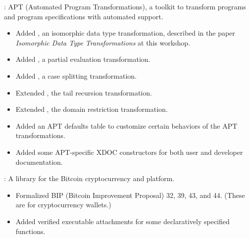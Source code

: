 \begin{frame}

\implibtitle

:
APT (Automated Program Transformations),
a toolkit to transform programs and program specifications
with automated support.
\begin{itemize}
\item
Added , an isomorphic data type transformation,
described in the paper
\textit{Isomorphic Data Type Transformations} at this workshop.
\item
Added , a partial evaluation transformation.
\item
Added , a case splitting transformation.
\item
Extended , the tail recursion transformation.
\item
Extended , the domain restriction transformation.
\item
Added an APT defaults table
to customize certain behaviors of the APT transformations.
\item
Added some APT-specific XDOC constructors
for both user and developer documentation.
\end{itemize}

\end{frame}


\begin{frame}

\implibtitle

:
A library for the Bitcoin cryptocurrency and platform.
\begin{itemize}
\item
Formalized BIP (Bitcoin Improvement Proposal) 32, 39, 43, and 44.
(These are for cryptocurrency wallets.)
\item
Added verified executable attachments
for some declaratively specified functions.
\end{itemize}

\end{frame}


